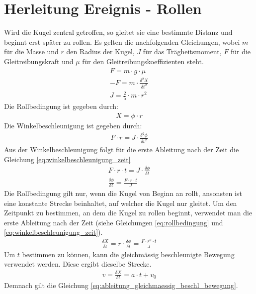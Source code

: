 \section{Herleitung Ereignis - Rollen}\label{anhang:herleitung:event:rollen}
Wird die Kugel zentral getroffen, so gleitet sie eine bestimmte Distanz und beginnt erst später zu rollen\cite{rollzeitpunkt}.
Es gelten die nachfolgenden Gleichungen, wobei $m$ für die Masse und $r$ den Radius der Kugel, $J$ für das
Trägheitsmoment, $F$ für die Gleitreibungskraft und $\mu$ für den Gleitreibungskoeffizienten steht.
\begin{align}
    F = m \cdot g \cdot \mu\\
    -F = m \cdot \frac{\delta^2 X}{\delta t^2}\\
    J = \frac{2}{5} \cdot m \cdot r^2
\end{align}
Die Rollbedingung ist gegeben durch:
\begin{align}
    X = \phi \cdot r\label{eq:rollbedingung}
\end{align}
Die Winkelbeschleunigung ist gegeben durch:
\begin{align}
    F \cdot r = J \cdot \frac{\delta^2 \phi}{\delta t^2}
\end{align}
Aus der Winkelbeschleunigung folgt für die erste Ableitung nach der Zeit die Gleichung \ref{eq:winkelbeschleunigung_zeit}
\begin{align}
    F \cdot r \cdot t = J \cdot \frac{\delta \phi}{\delta t}\\
    \frac{\delta \phi}{\delta t} = \frac{F \cdot r \cdot t}{J}\label{eq:winkelbeschleunigung_zeit}
\end{align}
Die Rollbedingung gilt nur, wenn die Kugel von Beginn an rollt, ansonsten ist eine konstante Strecke beinhaltet,
auf welcher die Kugel nur gleitet\cite{rollzeitpunkt}. Um den Zeitpunkt zu bestimmen, an dem die Kugel zu rollen
beginnt, verwendet man die erste Ableitung nach der Zeit (siehe Gleichungen \ref{eq:rollbedingung} und \ref{eq:winkelbeschleunigung_zeit}).
\begin{align}
    \frac{\delta X}{\delta t} = r \cdot \frac{\delta \phi}{\delta t} = \frac{F \cdot r^2 \cdot t}{J}\label{eq:ableitung_winkelbeschleunigung_zeit}
\end{align}
Um $t$ bestimmen zu können, kann die gleichmässig beschleunigte Bewegung verwendet werden. Diese ergibt dieselbe
Strecke.
\begin{align}
    v = \frac{\delta X}{\delta t} = a \cdot t + v_0
\end{align}
Demnach gilt die Gleichung \ref{eq:ableitung_gleichmaessig_beschl_bewegung}.
